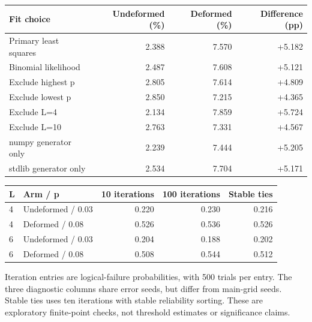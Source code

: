 \begin{center}\begin{tabular}{lrrr}
\toprule Fit choice & Undeformed (\%) & Deformed (\%) & Difference (pp)\\\midrule
Primary least squares & 2.388 & 7.570 & +5.182\\
Binomial likelihood & 2.487 & 7.608 & +5.121\\
Exclude highest p & 2.805 & 7.614 & +4.809\\
Exclude lowest p & 2.850 & 7.215 & +4.365\\
Exclude L=4 & 2.134 & 7.859 & +5.724\\
Exclude L=10 & 2.763 & 7.331 & +4.567\\
numpy generator only & 2.239 & 7.444 & +5.205\\
stdlib generator only & 2.534 & 7.704 & +5.171\\
\bottomrule\end{tabular}\end{center}
\begin{center}\begin{tabular}{llrrr}
\toprule L & Arm / p & 10 iterations & 100 iterations & Stable ties\\\midrule
4 & Undeformed / 0.03 & 0.220 & 0.230 & 0.216\\
4 & Deformed / 0.08 & 0.526 & 0.536 & 0.526\\
6 & Undeformed / 0.03 & 0.204 & 0.188 & 0.202\\
6 & Deformed / 0.08 & 0.508 & 0.544 & 0.512\\
\bottomrule\end{tabular}\end{center}
Iteration entries are logical-failure probabilities, with 500 trials per entry. The three diagnostic columns share error seeds, but differ from main-grid seeds. Stable ties uses ten iterations with stable reliability sorting. These are exploratory finite-point checks, not threshold estimates or significance claims.
